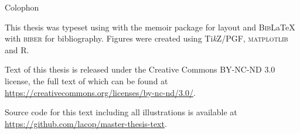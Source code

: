 \clearpage
\pagestyle{empty}
\null\vfil

\begin{adjustwidth}{2cm}{2cm}
\begin{center}
{\LARGE\textsf{Colophon}}
\end{center}
\noindent This thesis was typeset using \textsf{\XeLaTeX} with the \textsf{memoir} package for layout and \textsf{\textsc{Bib}\LaTeX} with \textsf{\textsc{biber}} for bibliography. Figures were created using \textsf{Ti\textit{k}Z/PGF}, \textsf{\textsc{matplotlib}} and \textsf{\textsc{R}}.

\vspace{2cm}

\begin{center}
{\Large \ccbyncndeu}
\end{center}

\noindent Text of this thesis is released under the \textsf{Creative Commons BY-NC-ND 3.0} license, the full text of which can be found at\\
\url{https://creativecommons.org/licenses/by-nc-nd/3.0/}.

\vspace{1cm}

\noindent Source code for this text including all illustrations is available at \url{https://github.com/lacop/master-thesis-text}.

\end{adjustwidth}

\vfil